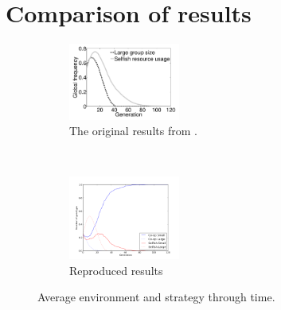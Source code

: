 \documentclass[11pt]{ecsarticle}
\begin{document}
\section{Comparison of results}\label{sc:reimp:results}
\begin{figure}
        \centering
        \begin{subfigure}[b]{0.4\textwidth}
                \includegraphics[width=0.4\textwidth]{orig_a.png}
                \caption{The original results from \cite{powers2007individual}.}
                \label{fig:orig:A}
        \end{subfigure}%
        ~ %
        \begin{subfigure}[b]{0.4\textwidth}
                \includegraphics[width=0.4\textwidth]{Code2/fig1.png}
                \caption{Reproduced results}
                \label{fig:orig:B}
        \end{subfigure}
        \caption{Average environment and strategy through time.}\label{fig:A}
\end{figure}
\end{document}
